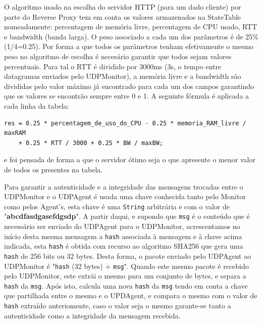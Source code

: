\documentclass{article}
\begin{document}
O algoritmo usado na escolha do servidor HTTP (para um dado cliente) por parte do Reverse Proxy tem em conta os valores armazenados na StateTable nomeadamente: percentagem de memória livre, percentagem de CPU usado, RTT e bandwidth (banda larga). O peso associado a cada um dos parâmetros é de 25\% (1/4=0.25). Por forma a que todos os parâmetros tenham efetivamente o mesmo peso no algoritmo de escolha é necesário garantir que todos sejam valores percentuais. Para tal o RTT é dividido por 3000ms (3s, o tempo entre datagramas enviados pelo UDPMonitor), a memória livre e a bandwidth são divididas pelo valor máximo já encontrado para cada um dos campos garantindo que os valores se encontrão sempre entre 0 e 1. A seguinte fórmula é aplicada a cada linha da tabela:
\begin{verbatim}
res = 0.25 * percentagem_de_uso_do_CPU - 0.25 * memoria_RAM_livre / maxRAM 
	+ 0.25 * RTT / 3000 + 0.25 * BW / maxBW;
\end{verbatim}
e foi pensada de forma a que o servidor ótimo seja o que apresente o menor valor de todos os presentes na tabela.

Para garantir a autenticidade e a integridade das mensagens trocadas entre o UDPMonitor e o UDPAgent é usada uma chave conhecida tanto pelo Monitor como pelos Agent's, esta chave é uma \texttt{String} arbitrária e com o valor de "\textbf{abcdfasdgasefdgsdp}". A partir daqui, e supondo que \texttt{msg} é o conteúdo que é necessário ser enviado do UDPAgent para o UDPMonitor, acrescentamos no início desta mesma mensagem a \texttt{hash} associada à mensagem e à chave acima indicada, esta \texttt{hash} é obtida com recurso ao algoritmo SHA256 que gera uma \texttt{hash} de 256 bits ou 32 bytes. Desta forma, o pacote enviado pelo UDPAgent ao UDPMonitor é "\texttt{hash} (32 bytes) + \texttt{msg}". Quando este mesmo pacote é recebido pelo UDPMonitor, este extrái o mesmo para um conjunto de bytes, e separa a \texttt{hash} da \texttt{msg}. Após isto, calcula uma nova \texttt{hash} da \texttt{msg} tendo em conta a chave que partilhada entre o mesmo e o UPDAgent, e compara o mesmo com o valor de \texttt{hash} extraído anteriomente, caso o valor seja o mesmo garante-se tanto a autenticidade como a integridade da mensagem recebida.
\end{document}
